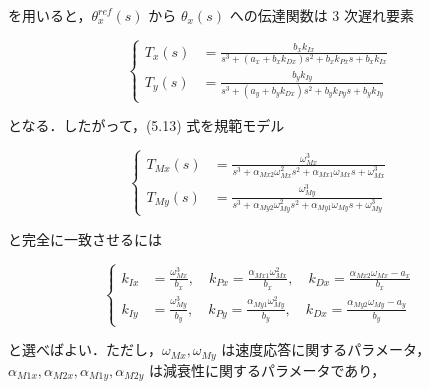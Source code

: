 を用いると，\( \theta_x^{ref}(s) \) から \( \theta_x(s) \) への伝達関数は 3 次遅れ要素

\begin{equation}
\left\{
\begin{aligned}
T_x(s) &= \frac{b_x k_{Ix}}{s^3 + (a_x + b_x k_{Dx})s^2 + b_x k_{Px}s + b_x k_{Ix}} \\
T_y(s) &= \frac{b_y k_{Iy}}{s^3 + (a_y + b_y k_{Dx})s^2 + b_y k_{Py}s + b_y k_{Iy}}
\end{aligned}
\right.
\tag{5.13}
\end{equation}

となる．したがって，(5.13) 式を規範モデル

\begin{equation}
\left\{
\begin{aligned}
T_{Mx}(s) &= \frac{\omega_{Mx}^3}{s^3 + \alpha_{Mx2} \omega_{Mx}^2 s^2 + \alpha_{Mx1} \omega_{Mx}s + \omega_{Mx}^3} \\
T_{My}(s) &= \frac{\omega_{My}^3}{s^3 + \alpha_{My2} \omega_{My}^2 s^2 + \alpha_{My1} \omega_{My}s + \omega_{My}^3}
\end{aligned}
\right.
\tag{5.14}
\end{equation}

と完全に一致させるには

\begin{equation}
\left\{
\begin{aligned}
k_{Ix} &= \frac{\omega_{Mx}^3}{b_x}, \quad k_{Px} = \frac{\alpha_{Mx1} \omega_{Mx}^2}{b_x}, \quad k_{Dx} = \frac{\alpha_{Mx2} \omega_{Mx} - a_x}{b_x} \\
k_{Iy} &= \frac{\omega_{My}^3}{b_y}, \quad k_{Py} = \frac{\alpha_{My1} \omega_{My}^2}{b_y}, \quad k_{Dx} = \frac{\alpha_{My2} \omega_{My} - a_y}{b_y}
\end{aligned}
\right.
\tag{5.15}
\end{equation}

と選べばよい．ただし，\(\omega_{Mx}, \omega_{My}\) は速度応答に関するパラメータ，\(\alpha_{M1x}, \alpha_{M2x}, \alpha_{M1y}, \alpha_{M2y}\) は減衰性に関するパラメータであり，

